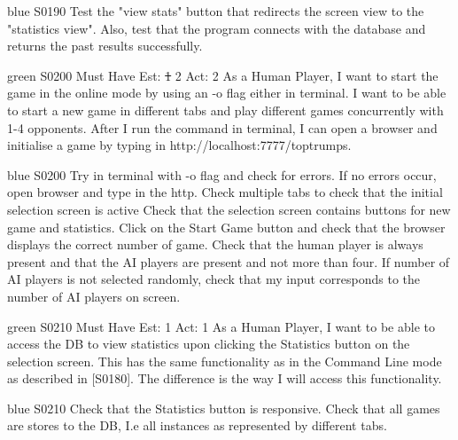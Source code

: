 \begin{card}{blue}
{S0190}{}{}{}
Test the "view stats" button that redirects the screen view to the "statistics view". Also, test that the program connects with the database and returns the past results successfully.
\end{card}


\newpage

\begin{card}{green}
{S0200}
{Must Have}
{Est: \st{1} 2}
{Act: 2}
As a Human Player, I want to start the game in the online mode by using an -o flag either in terminal.  
I want to be able to start a new game in different tabs and play different games concurrently with 1-4 opponents. 
After I run the command in terminal, I can open a browser and initialise a game by typing in http://localhost:7777/toptrumps.
\end{card}

\begin{card}{blue}
{S0200}{}{}{}
Try in terminal with -o flag and check for errors. 
If no errors occur, open browser and type in the http.
Check multiple tabs to check that the initial selection screen is active Check that the selection screen contains buttons for new game and statistics.
Click on the Start Game button and check that the browser displays the correct number of game. 
Check that the human player is always present and that the AI players are present and not more than four. 
If number of AI players is not selected randomly, check that my input corresponds to the number of AI players on screen.
\end{card}


\newpage

\begin{card}{green}
{S0210}
{Must Have}
{Est: 1}
{Act: 1}
As a Human Player, I want to be able to access the DB to view statistics upon clicking the Statistics button on the selection screen.
This has the same functionality as in the Command Line mode as described in [S0180].
The difference is the way I will access this functionality.
\end{card}

\begin{card}{blue}
{S0210}{}{}{}
Check that the Statistics button is responsive. 
Check that all games are stores to the DB, I.e all instances as represented by different tabs.
\end{card}

